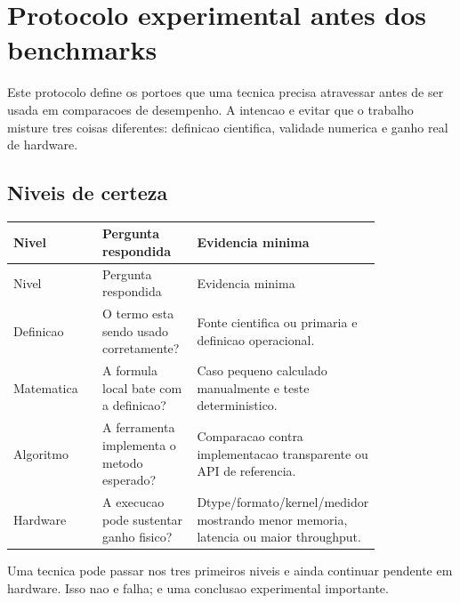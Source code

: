 

\chapter{Protocolo experimental antes dos benchmarks}






Este protocolo define os portoes que uma tecnica precisa atravessar antes de ser usada em comparacoes de desempenho. A intencao e evitar que o trabalho misture tres coisas diferentes: definicao cientifica, validade numerica e ganho real de hardware.



\section{Niveis de certeza}



\begin{longtable}{@{}>{\RaggedRight\arraybackslash}p{0.273\linewidth}>{\RaggedRight\arraybackslash}p{0.273\linewidth}>{\RaggedRight\arraybackslash}p{0.273\linewidth}@{}}
\toprule
Nivel & Pergunta respondida & Evidencia minima \\
\midrule
\endfirsthead
\toprule
Nivel & Pergunta respondida & Evidencia minima \\
\midrule
\endhead
Definicao & O termo esta sendo usado corretamente? & Fonte cientifica ou primaria e definicao operacional. \\
Matematica & A formula local bate com a definicao? & Caso pequeno calculado manualmente e teste deterministico. \\
Algoritmo & A ferramenta implementa o metodo esperado? & Comparacao contra implementacao transparente ou API de referencia. \\
Hardware & A execucao pode sustentar ganho fisico? & Dtype/\allowbreak{}formato/\allowbreak{}kernel/\allowbreak{}medidor mostrando menor memoria, latencia ou maior throughput. \\
\bottomrule
\end{longtable}




Uma tecnica pode passar nos tres primeiros niveis e ainda continuar pendente em hardware. Isso nao e falha; e uma conclusao experimental importante.



